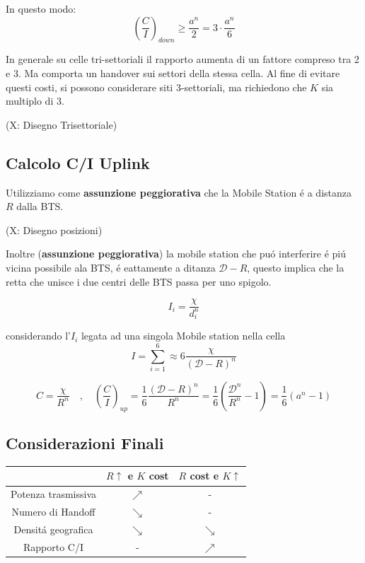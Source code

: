 \documentclass{article}
\begin{document}
In questo modo:
\[ {\left(\frac{C}{I}\right)}_{down}  \ge \frac{a^n}{2} = 3\cdot\frac{a^n}{6}\]

In generale su celle tri-settoriali il rapporto aumenta di un fattore compreso tra 2 e 3. Ma comporta un handover sui settori della stessa cella. Al fine di evitare questi costi, si possono considerare siti 3-settoriali, ma richiedono che $K$ sia multiplo di 3.

(X: Disegno Trisettoriale)

\subsection{Calcolo C/I Uplink}
Utilizziamo come \textbf{assunzione peggiorativa} che la Mobile Station \'e a distanza $R$ dalla BTS.

(X: Disegno posizioni)

Inoltre (\textbf{assunzione peggiorativa}) la mobile station che pu\'o interferire \'e pi\'u vicina possibile ala BTS, \'e eattamente a ditanza $\mathcal{D} - R$, questo implica che la retta che unisce i due centri delle BTS passa per uno spigolo.

\[I_i = \frac{\chi}{d_i^n} \]

considerando l'$I_i$ legata ad una singola Mobile station nella cella
\[ I = \sum\limits_{i=1}^6 \approx 6\frac{\chi}{{(\mathcal{D} - R)}^n} \]

\[ C = \frac{\chi}{R^n} \quad,\quad {\left(\frac{C}{I}\right)}_{up}
    = \frac{1}{6}\frac{{(\mathcal{D} - R)}^n}{R^n}
    = \frac{1}{6}\left(\frac{\mathcal{D}^n}{R^n} -1 \right) = \frac{1}{6}(a^n - 1)
\]

\subsection{Considerazioni Finali}
\begin{center}
\begin{tabular}{c|c|c}
    & $R\uparrow$ e $K$ cost & $R$ cost e $K\uparrow$\\
    \hline
    Potenza trasmissiva  & {\color{red}$\nearrow$}  & -\\
    Numero di Handoff    & {\color{green}$\searrow$}& -\\
    Densit\'a geografica & {\color{red}$\searrow$}  & {\color{red}$\searrow$}\\
    Rapporto C/I         & -                        & {\color{green}$\nearrow$}
\end{tabular}
\end{center}
\end{document}
